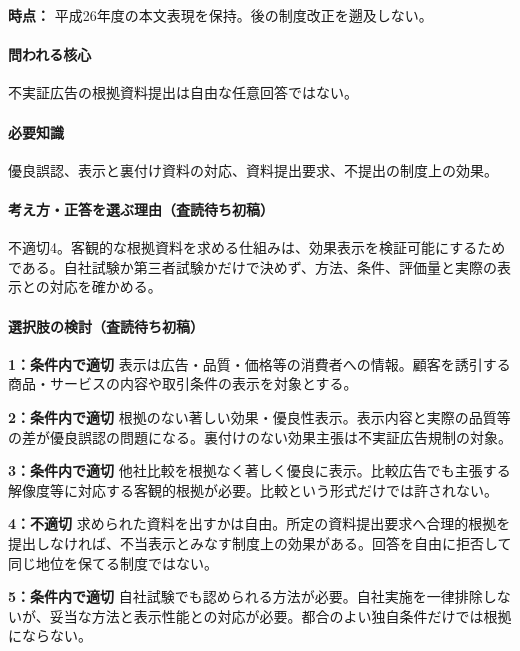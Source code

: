 \noindent\textbf{時点：} 平成26年度の本文表現を保持。後の制度改正を遡及しない。\par

\paragraph{問われる核心} 不実証広告の根拠資料提出は自由な任意回答ではない。

\paragraph{必要知識} 優良誤認、表示と裏付け資料の対応、資料提出要求、不提出の制度上の効果。

\paragraph{考え方・正答を選ぶ理由（査読待ち初稿）} 不適切4。客観的な根拠資料を求める仕組みは、効果表示を検証可能にするためである。自社試験か第三者試験かだけで決めず、方法、条件、評価量と実際の表示との対応を確かめる。

\paragraph{選択肢の検討（査読待ち初稿）}\mbox{}\par

\noindent\textbf{1：条件内で適切} 表示は広告・品質・価格等の消費者への情報。顧客を誘引する商品・サービスの内容や取引条件の表示を対象とする。\par

\noindent\textbf{2：条件内で適切} 根拠のない著しい効果・優良性表示。表示内容と実際の品質等の差が優良誤認の問題になる。裏付けのない効果主張は不実証広告規制の対象。\par

\noindent\textbf{3：条件内で適切} 他社比較を根拠なく著しく優良に表示。比較広告でも主張する解像度等に対応する客観的根拠が必要。比較という形式だけでは許されない。\par

\noindent\textbf{4：不適切} 求められた資料を出すかは自由。所定の資料提出要求へ合理的根拠を提出しなければ、不当表示とみなす制度上の効果がある。回答を自由に拒否して同じ地位を保てる制度ではない。\par

\noindent\textbf{5：条件内で適切} 自社試験でも認められる方法が必要。自社実施を一律排除しないが、妥当な方法と表示性能との対応が必要。都合のよい独自条件だけでは根拠にならない。\par

